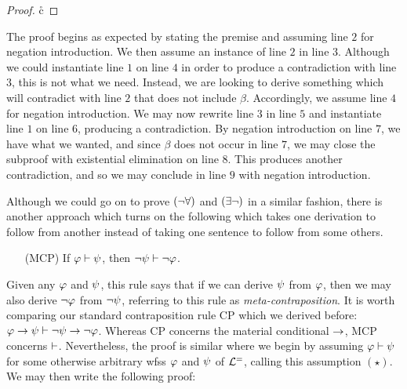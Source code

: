 \begin{proof}
	      \pr{}
    \open
              
        \open
            
            \open
                
                \r{c}
                
            \close
            
        \close
        
    \close
         
\end{proof}

The proof begins as expected by stating the premise and assuming line $2$ for negation introduction. 
We then assume an instance of line $2$ in line $3$.
Although we could instantiate line $1$ on line $4$ in order to produce a contradiction with line $3$, this is not what we need.
Instead, we are looking to derive something which will contradict with line $2$ that does not include $\beta$. 
Accordingly, we assume line $4$ for negation introduction. 
We may now rewrite line $3$ in line $5$ and instantiate line $1$ on line $6$, producing a contradiction. 
By negation introduction on line $7$, we have what we wanted, and since $\beta$ does not occur in line $7$, we may close the subproof with existential elimination on line $8$.
This produces another contradiction, and so we may conclude in line $9$ with negation introduction. 

Although we could go on to prove $(\neg\forall)$ and $(\exists\neg)$ in a similar fashion, there is another approach which turns on the following  which takes one derivation to follow from another instead of taking one sentence to follow from some others.
\begin{enumerate}[leftmargin=.75in]
  \item[(MCP)] If $\varphi \vdash \psi$, then $\neg\psi \vdash \neg\varphi$.
\end{enumerate}
Given any $\varphi$ and $\psi$, this rule says that if we can derive $\psi$ from $\varphi$, then we may also derive $\neg\varphi$ from $\neg\psi$, referring to this rule as \textit{meta-contraposition}.
It is worth comparing our standard contraposition rule CP which we derived before: $\varphi \rightarrow \psi \vdash \neg\psi \rightarrow \neg\varphi$.
Whereas CP concerns the material conditional $\rightarrow$, MCP concerns $\vdash$.
Nevertheless, the proof is similar where we begin by assuming $\varphi \vdash \psi$ for some otherwise arbitrary wfss $\varphi$ and $\psi$ of $\mathcal{L}^{=}$, calling this assumption $(\star)$.
We may then write the following proof:

